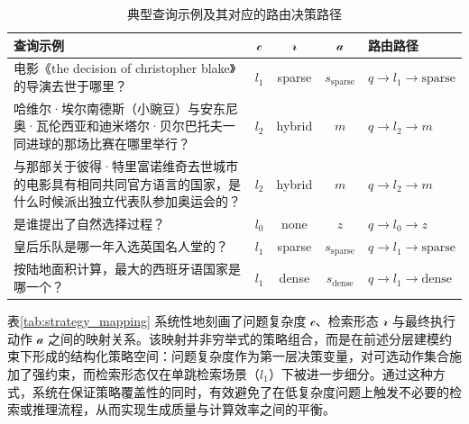 \begin{table}[htbp]
    \centering
    \small
    \caption{典型查询示例及其对应的路由决策路径}
    \label{tab:routing_examples}
    \renewcommand{\arraystretch}{1.35}
    \begin{tabular}{p{7.2cm} c c c p{4.2cm}}
        \toprule
        \textbf{查询示例} &
        $\mathcal{c}$ &
        $\mathcal{r}$ &
        $\mathcal{a}$ &
        \textbf{路由路径} \\
        \midrule
        
        电影《the decision of christopher blake》的导演去世于哪里？ 
        & $l_1$ & sparse & $s_{\text{sparse}}$
        & $q \rightarrow l_1 \rightarrow \text{sparse}$ \\
        
        哈维尔·埃尔南德斯（小豌豆）与安东尼奥·瓦伦西亚和迪米塔尔·贝尔巴托夫一同进球的那场比赛在哪里举行？
        & $l_2$ & hybrid & $m$
        & $q \rightarrow l_2 \rightarrow m$ \\
        
        与那部关于彼得·特里富诺维奇去世城市的电影具有相同共同官方语言的国家，是什么时候派出独立代表队参加奥运会的？
        & $l_2$ & hybrid & $m$
        & $q \rightarrow l_2 \rightarrow m$ \\
        
        是谁提出了自然选择过程？
        & $l_0$ & none & $z$
        & $q \rightarrow l_0 \rightarrow z$ \\
        
        皇后乐队是哪一年入选英国名人堂的？
        & $l_1$ & sparse & $s_{\text{sparse}}$
        & $q \rightarrow l_1 \rightarrow \text{sparse}$ \\
        
        按陆地面积计算，最大的西班牙语国家是哪一个？
        & $l_1$ & dense & $s_{\text{dense}}$
        & $q \rightarrow l_1 \rightarrow \text{dense}$ \\
        
        \bottomrule
    \end{tabular}
\end{table}

表\ref{tab:strategy_mapping} 系统性地刻画了问题复杂度 $\mathcal{c}$、检索形态 $\mathcal{r}$ 与最终执行动作 $\mathcal{a}$ 之间的映射关系。该映射并非穷举式的策略组合，而是在前述分层建模约束下形成的结构化策略空间：问题复杂度作为第一层决策变量，对可选动作集合施加了强约束，而检索形态仅在单跳检索场景（$l_1$）下被进一步细分。通过这种方式，系统在保证策略覆盖性的同时，有效避免了在低复杂度问题上触发不必要的检索或推理流程，从而实现生成质量与计算效率之间的平衡。


